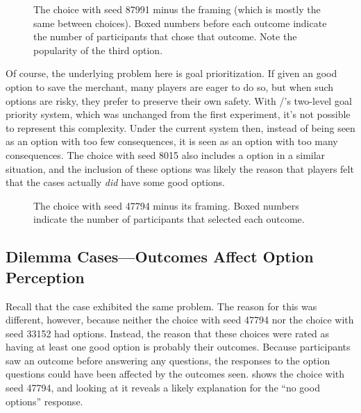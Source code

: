 \begin{figure}[t]
\caption[``Expected failure'' choice 87991]{The choice with seed 87991 minus the framing (which is mostly the same between choices). Boxed numbers before each outcome indicate the number of participants that chose that outcome. Note the popularity of the third option.}
\label{fig:e2-seed-87991}
\end{figure}


Of course, the underlying problem here is goal prioritization.
%
If given an good option to save the merchant, many players are eager to do so, but when such options are risky, they prefer to preserve their own safety.
%
With \dunyazad/'s two-level goal priority system, which was unchanged from the first experiment, it's not possible to represent this complexity.
%
Under the current system then, instead of  being seen as an option with too few consequences, it is seen as an option with too many consequences.
%
The choice with seed 8015 also includes a  option in a similar situation, and the inclusion of these options was likely the reason that players felt that the \expf{} cases actually \emph{did} have some good options.


\begin{figure}[h]
\caption[``Unexpected success'' choice 47794]{The \unxs{} choice with seed 47794 minus its framing. Boxed numbers indicate the number of participants that selected each outcome.}
\label{fig:e2-seed-47794}
\end{figure}


\subsection{Dilemma Cases---Outcomes Affect Option Perception}

Recall that the \unxs{} case exhibited the same problem.
%
The reason for this was different, however, because neither the choice with seed 47794 nor the choice with seed 33152 had  options.
%
Instead, the reason that these choices were rated as having at least one good option is probably their outcomes.
%
Because participants saw an outcome before answering any questions, the responses to the option questions could have been affected by the outcomes seen.
%
 shows the choice with seed 47794, and looking at it reveals a likely explanation for the ``no good options'' response.


